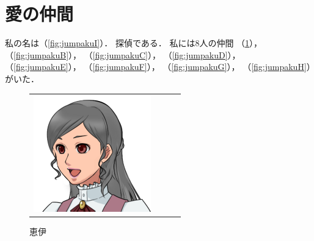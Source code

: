 \section{愛の仲間}\label{section:jumpakubegin}
私の名は（\ref{fig:jumpakuI}）．
探偵である．
私には8人の仲間
（\ref{fig:jumpakuA}），
（\ref{fig:jumpakuB}），
（\ref{fig:jumpakuC}），
（\ref{fig:jumpakuD}），
（\ref{fig:jumpakuE}），
（\ref{fig:jumpakuF}），
（\ref{fig:jumpakuG}），
（\ref{fig:jumpakuH}）がいた．
\begin{figure}[b]\centering
\begin{tabular}{cccc}
\begin{minipage}{0.2\textwidth}\includegraphics[width=\textwidth]{./jumpakuasset/A.png}\caption{恵伊}\label{fig:jumpakuA}\end{minipage}

\end{tabular}
\end{figure}
